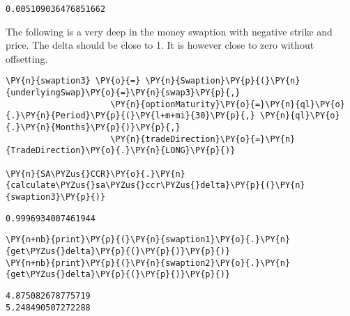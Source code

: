             \begin{tcolorbox}[breakable, size=fbox, boxrule=.5pt, pad at break*=1mm, opacityfill=0]
\begin{Verbatim}[commandchars=\\\{\}]
0.005109036476851662
\end{Verbatim}
\end{tcolorbox}
        
    The following is a very deep in the money swaption with negative strike
and price. The delta should be close to 1. It is however close to zero
without offsetting.

    \begin{tcolorbox}[breakable, size=fbox, boxrule=1pt, pad at break*=1mm,colback=cellbackground, colframe=cellborder]
\begin{Verbatim}[commandchars=\\\{\}]
\PY{n}{swaption3} \PY{o}{=} \PY{n}{Swaption}\PY{p}{(}\PY{n}{underlyingSwap}\PY{o}{=}\PY{n}{swap3}\PY{p}{,}
                     \PY{n}{optionMaturity}\PY{o}{=}\PY{n}{ql}\PY{o}{.}\PY{n}{Period}\PY{p}{(}\PY{l+m+mi}{30}\PY{p}{,} \PY{n}{ql}\PY{o}{.}\PY{n}{Months}\PY{p}{)}\PY{p}{,}
                     \PY{n}{tradeDirection}\PY{o}{=}\PY{n}{TradeDirection}\PY{o}{.}\PY{n}{LONG}\PY{p}{)}

\PY{n}{SA\PYZus{}CCR}\PY{o}{.}\PY{n}{calculate\PYZus{}sa\PYZus{}ccr\PYZus{}delta}\PY{p}{(}\PY{n}{swaption3}\PY{p}{)}
\end{Verbatim}
\end{tcolorbox}

            \begin{tcolorbox}[breakable, size=fbox, boxrule=.5pt, pad at break*=1mm, opacityfill=0]
\begin{Verbatim}[commandchars=\\\{\}]
0.9996934007461944
\end{Verbatim}
\end{tcolorbox}
        
    \begin{tcolorbox}[breakable, size=fbox, boxrule=1pt, pad at break*=1mm,colback=cellbackground, colframe=cellborder]
\begin{Verbatim}[commandchars=\\\{\}]
\PY{n+nb}{print}\PY{p}{(}\PY{n}{swaption1}\PY{o}{.}\PY{n}{get\PYZus{}delta}\PY{p}{(}\PY{p}{)}\PY{p}{)}
\PY{n+nb}{print}\PY{p}{(}\PY{n}{swaption2}\PY{o}{.}\PY{n}{get\PYZus{}delta}\PY{p}{(}\PY{p}{)}\PY{p}{)}
\end{Verbatim}
\end{tcolorbox}

    \begin{Verbatim}[commandchars=\\\{\}]
4.875082678775719
5.248490507272288
    \end{Verbatim}


